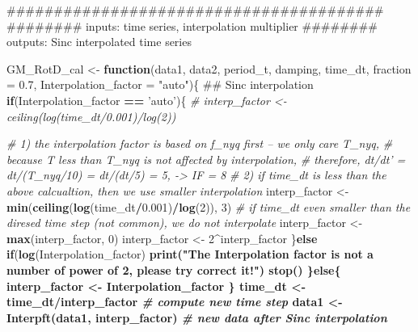 \documentclass[]{article}
\newenvironment{Shaded}{\begin{snugshade}}{\end{snugshade}}
\newcommand{\KeywordTok}[1]{\textcolor[rgb]{0.13,0.29,0.53}{\textbf{#1}}}
\newcommand{\DataTypeTok}[1]{\textcolor[rgb]{0.13,0.29,0.53}{#1}}
\newcommand{\DecValTok}[1]{\textcolor[rgb]{0.00,0.00,0.81}{#1}}
\newcommand{\FloatTok}[1]{\textcolor[rgb]{0.00,0.00,0.81}{#1}}
\newcommand{\StringTok}[1]{\textcolor[rgb]{0.31,0.60,0.02}{#1}}
\newcommand{\CommentTok}[1]{\textcolor[rgb]{0.56,0.35,0.01}{\textit{#1}}}
\newcommand{\ControlFlowTok}[1]{\textcolor[rgb]{0.13,0.29,0.53}{\textbf{#1}}}
\newcommand{\OperatorTok}[1]{\textcolor[rgb]{0.81,0.36,0.00}{\textbf{#1}}}
\newcommand{\NormalTok}[1]{#1}
\begin{document}
\begin{Shaded}
\begin{Highlighting}[]
\NormalTok{########################################}
\NormalTok{######## inputs: time series, interpolation multiplier}
\NormalTok{######## outputs: Sinc interpolated time series}


\NormalTok{GM_RotD_cal <-}\StringTok{ }\ControlFlowTok{function}\NormalTok{(data1, data2, period_t, damping, time_dt, }\DataTypeTok{fraction =} \FloatTok{0.7}\NormalTok{, }\DataTypeTok{Interpolation_factor =} \StringTok{"auto"}\NormalTok{)\{}
\NormalTok{  ## Sinc interpolation}
  \ControlFlowTok{if}\NormalTok{(Interpolation_factor }\OperatorTok{==}\StringTok{ 'auto'}\NormalTok{)\{}
    \CommentTok{# interp_factor <- ceiling(log(time_dt/0.001)/log(2))}

    \CommentTok{# 1) the interpolation factor is based on f_nyq first -- we only care T_nyq,}
    \CommentTok{# because T less than T_nyq is not affected by interpolation,}
    \CommentTok{# therefore, dt/dt' = dt/(T_nyq/10) = dt/(dt/5) = 5, -> IF = 8}
    \CommentTok{# 2) if time_dt is less than the above calcualtion, then we use smaller interpolation}
\NormalTok{    interp_factor <-}\StringTok{ }\KeywordTok{min}\NormalTok{(}\KeywordTok{ceiling}\NormalTok{(}\KeywordTok{log}\NormalTok{(time_dt}\OperatorTok{/}\FloatTok{0.001}\NormalTok{)}\OperatorTok{/}\KeywordTok{log}\NormalTok{(}\DecValTok{2}\NormalTok{)), }\DecValTok{3}\NormalTok{)}
    \CommentTok{# if time_dt even smaller than the diresed time step (not common), we do not interpolate}
\NormalTok{    interp_factor <-}\StringTok{ }\KeywordTok{max}\NormalTok{(interp_factor, }\DecValTok{0}\NormalTok{)}
\NormalTok{    interp_factor <-}\StringTok{ }\DecValTok{2}\OperatorTok{^}\NormalTok{interp_factor}
\NormalTok{  \}}\ControlFlowTok{else} \ControlFlowTok{if}\NormalTok{(}\KeywordTok{log}\NormalTok{(Interpolation_factor)}\OperatorTok{%%}\KeywordTok{log}\NormalTok{(}\DecValTok{2}\NormalTok{) }\OperatorTok{!=}\StringTok{ }\DecValTok{0}\NormalTok{)\{}
    \KeywordTok{print}\NormalTok{(}\StringTok{"The Interpolation factor is not a number of power of 2, please try correct it!"}\NormalTok{)}
    \KeywordTok{stop}\NormalTok{()}
\NormalTok{  \}}\ControlFlowTok{else}\NormalTok{\{}
\NormalTok{    interp_factor <-}\StringTok{ }\NormalTok{Interpolation_factor}
\NormalTok{  \}}
\NormalTok{  time_dt <-}\StringTok{ }\NormalTok{time_dt}\OperatorTok{/}\NormalTok{interp_factor }\CommentTok{# compute new time step}
\NormalTok{  data1 <-}\StringTok{ }\KeywordTok{Interpft}\NormalTok{(data1, interp_factor) }\CommentTok{# new data after Sinc interpolation}
}
\end{Highlighting}
\end{Shaded}
\end{document}
